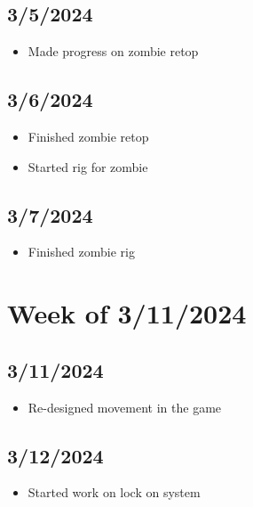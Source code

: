 \documentclass{article}
\begin{document}
\subsection*{3/5/2024}
\begin{itemize}
   \item Made progress on zombie retop
\end{itemize}
\subsection*{3/6/2024}
\begin{itemize}
   \item Finished zombie retop
   \item Started rig for zombie
\end{itemize}
\subsection*{3/7/2024}
\begin{itemize}
   \item Finished zombie rig
\end{itemize}

\section*{Week of 3/11/2024}
\subsection*{3/11/2024}
\begin{itemize}
   \item Re-designed movement in the game
\end{itemize}
\subsection*{3/12/2024}
\begin{itemize}
   \item Started work on lock on system
\end{itemize}
\end{document}
